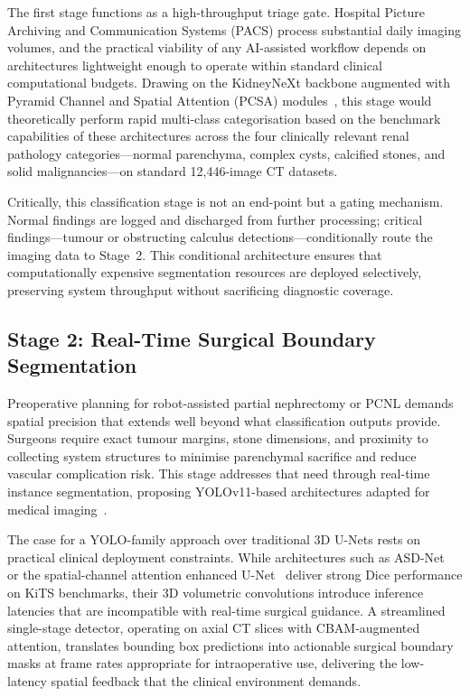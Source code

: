 The first stage functions as a high-throughput triage gate. Hospital Picture Archiving and Communication Systems (PACS) process substantial daily imaging volumes, and the practical viability of any AI-assisted workflow depends on architectures lightweight enough to operate within standard clinical computational budgets. Drawing on the KidneyNeXt backbone augmented with Pyramid Channel and Spatial Attention (PCSA) modules~\cite{alqahtani2025kidneynext, tawfik2026pcsa}, this stage would theoretically perform rapid multi-class categorisation based on the benchmark capabilities of these architectures across the four clinically relevant renal pathology categories---normal parenchyma, complex cysts, calcified stones, and solid malignancies---on standard 12,446-image CT datasets. 

Critically, this classification stage is not an end-point but a gating mechanism. Normal findings are logged and discharged from further processing; critical findings---tumour or obstructing calculus detections---conditionally route the imaging data to Stage~2. This conditional architecture ensures that computationally expensive segmentation resources are deployed selectively, preserving system throughput without sacrificing diagnostic coverage.

\subsection{Stage 2: Real-Time Surgical Boundary Segmentation}
\label{subsec:stage2_segmentation}

Preoperative planning for robot-assisted partial nephrectomy or PCNL demands spatial precision that extends well beyond what classification outputs provide. Surgeons require exact tumour margins, stone dimensions, and proximity to collecting system structures to minimise parenchymal sacrifice and reduce vascular complication risk. This stage addresses that need through real-time instance segmentation, proposing YOLOv11-based architectures adapted for medical imaging~\cite{akhtar2026yolov11}.

The case for a YOLO-family approach over traditional 3D U-Nets rests on practical clinical deployment constraints. While architectures such as ASD-Net~\cite{ji2024asdnet} or the spatial-channel attention enhanced U-Net~\cite{gohil2024kidney} deliver strong Dice performance on KiTS benchmarks, their 3D volumetric convolutions introduce inference latencies that are incompatible with real-time surgical guidance. A streamlined single-stage detector, operating on axial CT slices with CBAM-augmented attention, translates bounding box predictions into actionable surgical boundary masks at frame rates appropriate for intraoperative use, delivering the low-latency spatial feedback that the clinical environment demands.

